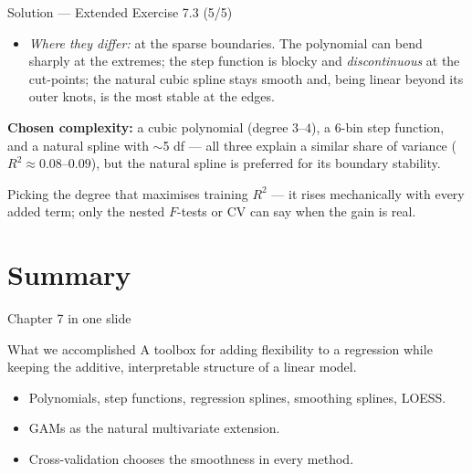 \documentclass[aspectratio=169,11pt]{beamer}
\begin{document}
\begin{frame}{Solution --- Extended Exercise 7.3 (5/5)}
\begin{solutionbox}
  \begin{itemize}
  \item \emph{Where they differ:} at the sparse boundaries. The polynomial can bend sharply at the extremes; the step function is blocky and \emph{discontinuous} at the cut-points; the natural cubic spline stays smooth and, being linear beyond its outer knots, is the most stable at the edges.
\end{itemize}
\textbf{Chosen complexity:} a cubic polynomial (degree $3$--$4$), a $6$-bin step function, and a natural spline with $\sim$5 df --- all three explain a similar share of variance ($R^2\approx0.08$--$0.09$), but the natural spline is preferred for its boundary stability.
\end{solutionbox}
\begin{mistake}
Picking the degree that maximises training $R^2$ --- it rises mechanically with every added term; only the nested $F$-tests or CV can say when the gain is real.
\end{mistake}
\end{frame}



\section{Summary}

\begin{frame}{Chapter 7 in one slide}
  \begin{block}{What we accomplished}
    A toolbox for adding flexibility to a regression while keeping the
    additive, interpretable structure of a linear model.
  \end{block}
  \begin{itemize}
    \item Polynomials, step functions, regression splines, smoothing
          splines, LOESS.
    \item GAMs as the natural multivariate extension.
    \item Cross-validation chooses the smoothness in every method.
  \end{itemize}
\end{frame}
\end{document}
